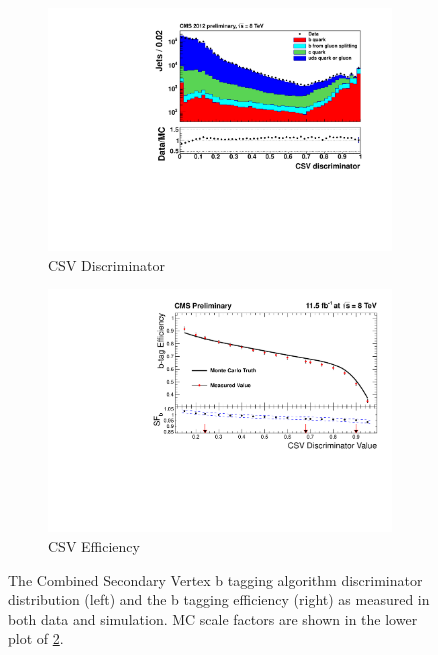 \begin{figure}[h!]
  \centering
  \begin{subfigure}[b]{0.46\textwidth}
    \includegraphics[width=\textwidth]{Figs/btag/csv_discrim.pdf}
    \caption{CSV Discriminator}
    \label{fig:btag_csv_discrim}
  \end{subfigure}
  \begin{subfigure}[b]{0.46\textwidth}
    \includegraphics[width=\textwidth]{Figs/btag/csv_eff.pdf}
    \caption{CSV Efficiency}
    \label{fig:btag_csv_eff}
  \end{subfigure}
  \caption{The Combined Secondary Vertex b tagging algorithm discriminator
  distribution (left) and the b tagging efficiency (right) as measured in both
  data and simulation. MC scale factors are shown in the lower plot of
  \ref{fig:btag_csv_eff}.}
  \label{fig:btag_csv}
\end{figure}

